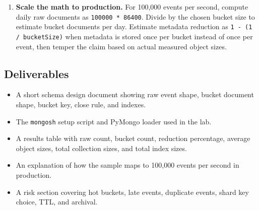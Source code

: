 \begin{enumerate}
\begin{lstlisting}[language=JavaScript, caption={\texttt{mongosh} validation queries for count, size, and timeline access.}]
use iot_capstone;
const rawStats = db.raw_events.stats();
const bucketStats = db.metric_buckets.stats();
printjson({
  rawCount: db.raw_events.countDocuments(),
  bucketCount: db.metric_buckets.countDocuments(),
  rawAvgObjSize: rawStats.avgObjSize,
  bucketAvgObjSize: bucketStats.avgObjSize,
  rawIndexSize: rawStats.totalIndexSize,
  bucketIndexSize: bucketStats.totalIndexSize
});

printjson(db.metric_buckets.find({
  tenantId: "tenant-acme",
  deviceId: "press-017",
  sensor: "temperature",
  bucketStart: { $gte: ISODate("2026-07-31T07:37:00Z") }
}).sort({ bucketStart: 1 }).explain("executionStats"));
\end{lstlisting}

    \item \textbf{Scale the math to production.} For 100,000 events per second, compute daily raw documents as \texttt{100000 * 86400}. Divide by the chosen bucket size to estimate bucket documents per day. Estimate metadata reduction as \texttt{1 - (1 / bucketSize)} when metadata is stored once per bucket instead of once per event, then temper the claim based on actual measured object sizes.
\end{enumerate}

\subsection*{Deliverables}
\begin{itemize}
    \item A short schema design document showing raw event shape, bucket document shape, bucket key, close rule, and indexes.
    \item The \texttt{mongosh} setup script and PyMongo loader used in the lab.
    \item A results table with raw count, bucket count, reduction percentage, average object sizes, total collection sizes, and total index sizes.
    \item An explanation of how the sample maps to 100,000 events per second in production.
    \item A risk section covering hot buckets, late events, duplicate events, shard key choice, TTL, and archival.
\end{itemize}

